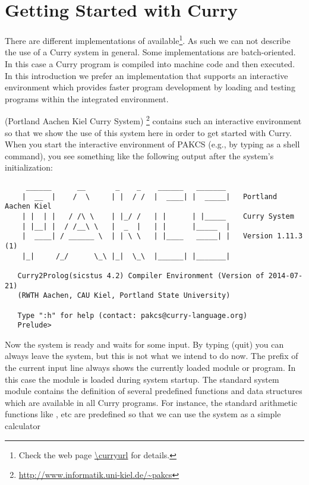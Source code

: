 \chapter{Getting Started with Curry}

There are different implementations of \curry{}
available\footnote{Check the web page \url{\curryurl} for details.}.
As such we can not describe the use of a Curry system
in general. Some implementations are batch-oriented.  In this case a 
Curry program is compiled into machine code and then executed. 
In this introduction we prefer an implementation that supports an interactive environment which provides faster program development by loading and testing programs within the integrated environment.

\pakcs{} (Portland Aachen Kiel Curry System)
\cite{Hanus14PAKCS}\footnote{\url{http://www.informatik.uni-kiel.de/~pakcs}}
contains such an interactive environment so that we show the use
of this system here in order to get started with Curry.
When you start the interactive environment of PAKCS
(e.g., by typing 
as a shell command),
you see something like the following output after the system's
initialization:
\begin{verbatim}
     ______      __       _    _    ______   _______     
    |  __  |    /  \     | |  / /  |  ____| |  _____|   Portland Aachen Kiel
    | |  | |   / /\ \    | |_/ /   | |      | |_____    Curry System
    | |__| |  / /__\ \   |  _  |   | |      |_____  |   
    |  ____| / ______ \  | | \ \   | |____   _____| |   Version 1.11.3 (1)
    |_|     /_/      \_\ |_|  \_\  |______| |_______|   
   
   Curry2Prolog(sicstus 4.2) Compiler Environment (Version of 2014-07-21)
   (RWTH Aachen, CAU Kiel, Portland State University)
   
   Type ":h" for help (contact: pakcs@curry-language.org)
   Prelude> 
\end{verbatim}
Now the system is ready and waits for some input.
By typing  (quit) you can always leave the system,
but this is not what we intend to do now.
The prefix of the current input line always shows the currently
loaded module or program. In this case the module
is loaded during system startup.
The standard system module  contains
the definition of several predefined functions and data structures
which are available in all Curry programs.
For instance, the standard arithmetic functions like \code{+}, \code{*} etc
are predefined so that we can use the system as a simple calculator
